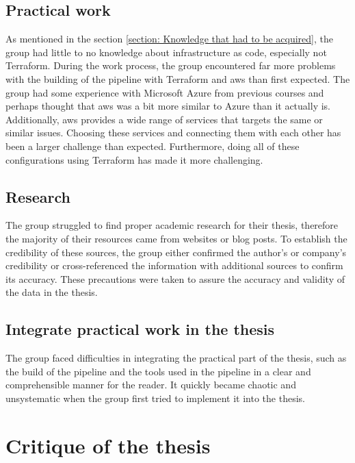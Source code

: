 \subsection{Practical work}
As mentioned in the section \ref{section: Knowledge that had to be acquired}, the group had little to no knowledge about \gls{infrastructure as code}, especially not Terraform. During the work process, the group encountered far more problems with the building of the pipeline with Terraform and \acrshort{aws} than first expected. The group had some experience with Microsoft Azure from previous courses and perhaps thought that \acrshort{aws} was a bit more similar to Azure than it actually is. Additionally, \acrshort{aws} provides a wide range of services that targets the same or similar issues. Choosing these services and connecting them with each other has been a larger challenge than expected. Furthermore, doing all of these configurations using Terraform has made it more challenging.

\subsection{Research}
The group struggled to find proper academic research for their thesis, therefore the majority of their resources came from websites or blog posts. To establish the credibility of these sources, the group either confirmed the author's or company's credibility or cross-referenced the information with additional sources to confirm its accuracy. These precautions were taken to assure the accuracy and validity of the data in the thesis.

\subsection{Integrate practical work in the thesis}%
The group faced difficulties in integrating the practical part of the thesis, such as the build of the pipeline and the tools used in the pipeline in a clear and comprehensible manner for the reader. It quickly became chaotic and unsystematic when the group first tried to implement it into the thesis. 

\section{Critique of the thesis}

